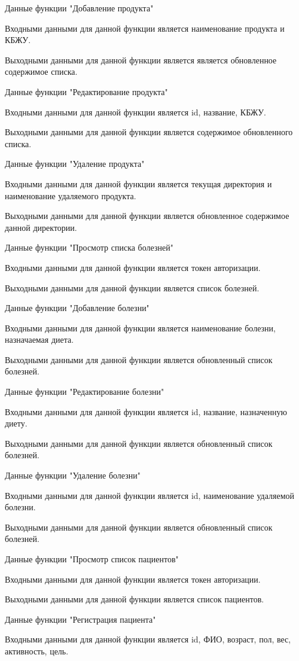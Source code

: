 Данные функции "Добавление продукта"

Входными данными для данной функции является наименование продукта и КБЖУ.

Выходными данными для данной функции является является обновленное содержимое списка.

Данные функции "Редактирование продукта"

Входными данными для данной функции является id, название, КБЖУ.

Выходными данными для данной функции является содержимое обновленного списка.

Данные функции "Удаление продукта"

Входными данными для данной функции является текущая директория и наименование удаляемого продукта.

Выходными данными для данной функции является обновленное содержимое данной директории.

Данные функции "Просмотр списка болезней"

Входными данными для данной функции является токен авторизации.

Выходными данными для данной функции является список болезней.

Данные функции "Добавление болезни"

Входными данными для данной функции является наименование болезни, назначаемая диета.

Выходными данными для данной функции является обновленный список болезней.

Данные функции "Редактирование болезни"

Входными данными для данной функции является id, название, назначенную диету.

Выходными данными для данной функции является обновленный список болезней.

Данные функции "Удаление болезни"

Входными данными для данной функции является id, наименование удаляемой болезни.

Выходными данными для данной функции является обновленный список болезней.

Данные функции "Просмотр список пациентов"

Входными данными для данной функции является токен авторизации.

Выходными данными для данной функции является список пациентов.

Данные функции "Регистрация пациента"

Входными данными для данной функции является id, ФИО, возраст, пол, вес, активность, цель.

